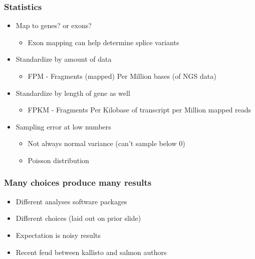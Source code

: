 \documentclass[14pt]{beamer}
\begin{document}
\begin{frame}
\frametitle{Statistics}
	\begin{itemize}
		\item<+-> Map to genes? or exons?
		\begin{itemize}
			\item Exon mapping can help determine splice variants
		\end{itemize}
		\item<+-> Standardize by amount of data
		\begin{itemize}
			\item<+-> FPM - Fragments (mapped) Per Million bases (of NGS data)
		\end{itemize}
		\item<+-> Standardize by length of gene as well
		\begin{itemize}
			\item<+-> FPKM - Fragments Per Kilobase of transcript per Million mapped reads
		\end{itemize}
		\item<+-> Sampling error at low numbers
		\begin{itemize}
			\item<+-> Not always normal variance (can't sample below 0)
			\item<+-> Poisson distribution
		\end{itemize}
	\end{itemize}
\end{frame}

\begin{frame}
\frametitle{Many choices produce many results}
	\begin{itemize}
		\item<+-> Different analyses software packages
		\item<+-> Different choices (laid out on prior slide)
		\item<+-> Expectation is noisy results
		\item<+-> Recent feud between kallisto and salmon authors
	\end{itemize}
\end{frame}
\end{document}
